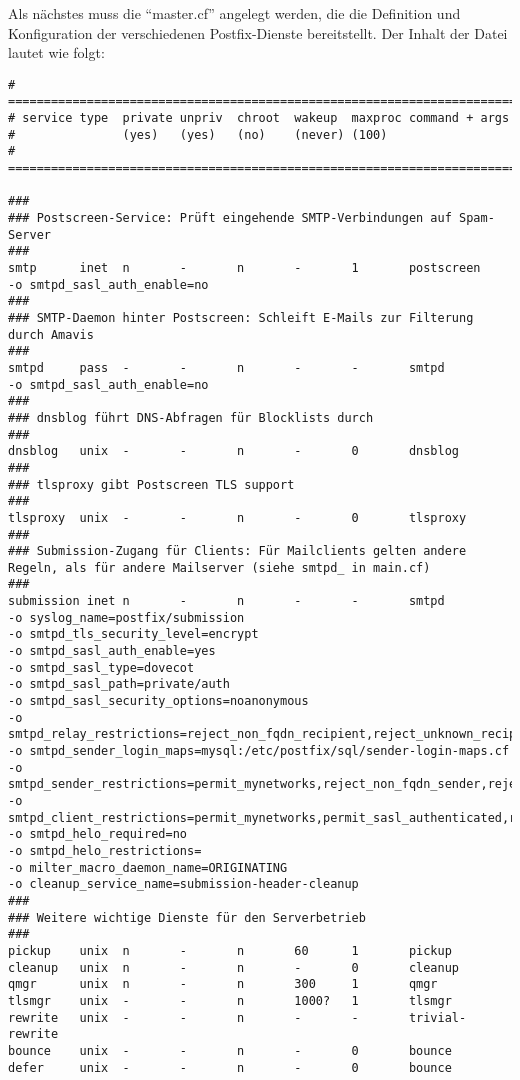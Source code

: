 Als nächstes muss die ``master.cf'' angelegt werden, die die Definition und Konfiguration der verschiedenen Postfix-Dienste bereitstellt. Der Inhalt der Datei lautet wie folgt:
\begin{lstlisting}[caption=master.cf - Postfix]
# ==========================================================================
# service type  private unpriv  chroot  wakeup  maxproc command + args
#               (yes)   (yes)   (no)    (never) (100)
# ==========================================================================

###
### Postscreen-Service: Prüft eingehende SMTP-Verbindungen auf Spam-Server
###
smtp      inet  n       -       n       -       1       postscreen
-o smtpd_sasl_auth_enable=no
###
### SMTP-Daemon hinter Postscreen: Schleift E-Mails zur Filterung durch Amavis
###
smtpd     pass  -       -       n       -       -       smtpd
-o smtpd_sasl_auth_enable=no
###
### dnsblog führt DNS-Abfragen für Blocklists durch
###
dnsblog   unix  -       -       n       -       0       dnsblog
###
### tlsproxy gibt Postscreen TLS support
###
tlsproxy  unix  -       -       n       -       0       tlsproxy
###
### Submission-Zugang für Clients: Für Mailclients gelten andere Regeln, als für andere Mailserver (siehe smtpd_ in main.cf)
###
submission inet n       -       n       -       -       smtpd
-o syslog_name=postfix/submission
-o smtpd_tls_security_level=encrypt
-o smtpd_sasl_auth_enable=yes
-o smtpd_sasl_type=dovecot
-o smtpd_sasl_path=private/auth
-o smtpd_sasl_security_options=noanonymous
-o smtpd_relay_restrictions=reject_non_fqdn_recipient,reject_unknown_recipient_domain,permit_mynetworks,permit_sasl_authenticated,reject
-o smtpd_sender_login_maps=mysql:/etc/postfix/sql/sender-login-maps.cf
-o smtpd_sender_restrictions=permit_mynetworks,reject_non_fqdn_sender,reject_sender_login_mismatch,permit_sasl_authenticated,reject
-o smtpd_client_restrictions=permit_mynetworks,permit_sasl_authenticated,reject
-o smtpd_helo_required=no
-o smtpd_helo_restrictions=
-o milter_macro_daemon_name=ORIGINATING
-o cleanup_service_name=submission-header-cleanup
###
### Weitere wichtige Dienste für den Serverbetrieb
###
pickup    unix  n       -       n       60      1       pickup
cleanup   unix  n       -       n       -       0       cleanup
qmgr      unix  n       -       n       300     1       qmgr
tlsmgr    unix  -       -       n       1000?   1       tlsmgr
rewrite   unix  -       -       n       -       -       trivial-rewrite
bounce    unix  -       -       n       -       0       bounce
defer     unix  -       -       n       -       0       bounce

\end{lstlisting}
